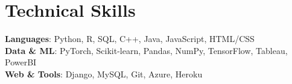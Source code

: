 \documentclass[letterpaper,11pt]{article}
\begin{document}
\section{Technical Skills}
 \begin{itemize}[leftmargin=0.15in, label={}]
    \small{\item{
     \textbf{Languages}{: Python, R, SQL, C++, Java, JavaScript, HTML/CSS} \\
     \textbf{Data \& ML}{: PyTorch, Scikit-learn, Pandas, NumPy, TensorFlow, Tableau, PowerBI} \\
     \textbf{Web \& Tools}{: Django, MySQL, Git, Azure, Heroku} \\
    }}
 \end{itemize}

\end{document}
